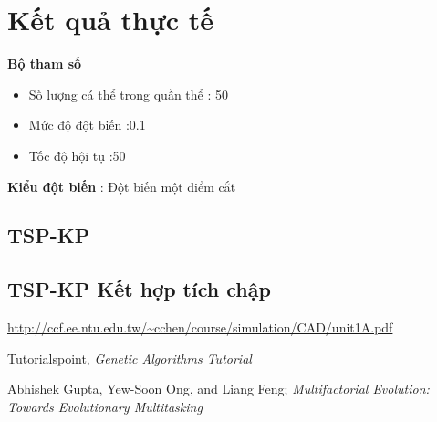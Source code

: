 \documentclass[a4paper,12pt]{report}
\begin{document}
\section{Kết quả thực tế}
\textbf{Bộ tham số}
\begin{itemize}
\item Số lượng cá thể trong quần thể : 50
\item Mức độ đột biến :0.1
\item Tốc độ hội tụ :50
\end{itemize}

\textbf{Kiểu đột biến} : Đột biến một điểm cắt

\subsection{TSP-KP}
\subsection{TSP-KP Kết hợp tích chập}



\begin{thebibliography}{9}
 \url{http://ccf.ee.ntu.edu.tw/~cchen/course/simulation/CAD/unit1A.pdf}

 Tutorialspoint, \textit{Genetic Algorithms Tutorial}

 Abhishek Gupta, Yew-Soon Ong, and Liang Feng; \textit{Multifactorial Evolution: Towards Evolutionary Multitasking}

\end{thebibliography}
\end{document}
